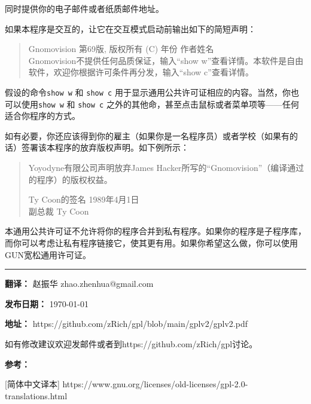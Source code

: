 \documentclass[11pt]{article}
\begin{document}
同时提供你的电子邮件或者纸质邮件地址。

如果本程序是交互的，让它在交互模式启动前输出如下的简短声明：


\begin{quote}
Gnomovision 第69版, 版权所有 (C) 年份  作者姓名 \\
Gnomovision不提供任何品质保证，输入“show w”查看详情。本软件是自由软件，欢迎你根据许可条件再分发，输入“show c”查看详情。
\end{quote}

假设的命令{\tt show w} 和 {\tt show c} 用于显示通用公共许可证相应的内容。当然，你也可以使用{\tt show w} 和 {\tt show c}
之外的其他命，甚至点击鼠标或者菜单项等——任何适合你程序的方式。

如有必要，你还应该得到你的雇主（如果你是一名程序员）或者学校（如果有的话）签署该本程序的放弃版权声明。如下例所示：

\begin{quote}
  Yoyodyne有限公司声明放弃James Hacker所写的“Gnomovision”（编译通过的程序）的版权权益。


  Ty Coon的签名 1989年4月1日 \\
  副总裁 Ty Coon
\end{quote}

本通用公共许可证不允许将你的程序合并到私有程序。如果你的程序是子程序库，而你可以考虑让私有程序链接它，使其更有用。如果你希望这么做，你可以使用GUN宽松通用许可证。

\vfill

\noindent\rule{\textwidth}{0.4pt}

\textbf{翻译：} 赵振华 zhao.zhenhua@gmail.com

\textbf{发布日期：} \today

\textbf{地址：} https://github.com/zRich/gpl/blob/main/gplv2/gplv2.pdf

如有修改建议欢迎发邮件或者到https://github.com/zRich/gpl讨论。

\textbf{参考：} 

[简体中文译本] https://www.gnu.org/licenses/old-licenses/gpl-2.0-translations.html
\end{document}
